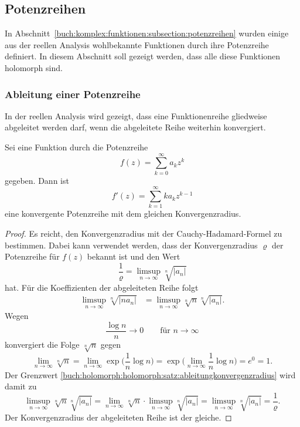 %
%
\subsection{Potenzreihen
\label{buch:holomorph:holomorph:subsection:potenzreihen}}
In Abschnitt~\ref{buch:komplex:funktionen:subsection:potenzreihen}
wurden einige aus der reellen Analysis wohlbekannte Funktionen
durch ihre Potenzreihe definiert.
In diesem Abschnitt soll gezeigt werden, dass alle diese Funktionen
holomorph sind.

%
%
\subsubsection{Ableitung einer Potenzreihe}
In der reellen Analysis wird gezeigt, dass eine Funktionenreihe gliedweise
abgeleitet werden darf, wenn die abgeleitete Reihe weiterhin konvergiert.

\begin{satz}
\label{buch:holomorph:holomorph:satz:potenzreihe-ableitung}
Sei eine Funktion durch die Potenzreihe
%
\[
f(z)
=
\sum_{k=0}^\infty a_k z^k
\]
gegeben.
Dann ist
\[
f'(z)
=
\sum_{k=1}^\infty ka_k z^{k-1}
\]
eine konvergente Potenzreihe mit dem gleichen Konvergenzradius.
%
\end{satz}

\begin{proof}
Es reicht, den Konvergenzradius mit der Cauchy-Hadamard-Formel zu
bestimmen.
Dabei kann verwendet werden, dass der Konvergenzradius $\varrho$
der Potenzreihe für $f(z)$ bekannt ist und den Wert
\[
\frac{1}{\varrho}
=
\limsup_{n\to\infty} \!\sqrt[n]{|a_n|}
\]
hat.
Für die Koeffizienten der abgeleiteten Reihe folgt
\begin{align}
\limsup_{n\to\infty} \!\sqrt[n]{|na_n|}
&=
\limsup_{n\to\infty}
\!\sqrt[n]{n}
\!\sqrt[n]{|a_n|}.
\label{buch:holomorph:holomorph:satz:ableitungkonvergenzradius}
\end{align}
Wegen
\[
\frac{\log n}{n} \to 0\qquad\text{für $n\to\infty$}
\]
konvergiert die Folge $\!\sqrt[n]{n}$ gegen
\[
\lim_{n\to\infty}
\!\sqrt[n]{n}
=
\lim_{n\to\infty}
\exp \biggl(
\frac{1}{n}\log n
\biggr)
=
\exp \biggl(
\lim_{n\to\infty}
\frac{1}{n}\log n
\biggr)
=
e^0
=
1.
\]
Der Grenzwert 
\eqref{buch:holomorph:holomorph:satz:ableitungkonvergenzradius}
wird damit zu
\[
\limsup_{n\to\infty}
\!\sqrt[n]{n}
\!\sqrt[n]{|a_n|}
=
\lim_{n\to\infty}
\!\sqrt[n]{n}
\cdot
\limsup_{n\to\infty}
\!\sqrt[n]{|a_n|}
=
\limsup_{n\to\infty}
\!\sqrt[n]{|a_n|}
=
\frac{1}{\varrho}.
\]
Der Konvergenzradius der abgeleiteten Reihe ist der gleiche.
\end{proof}

